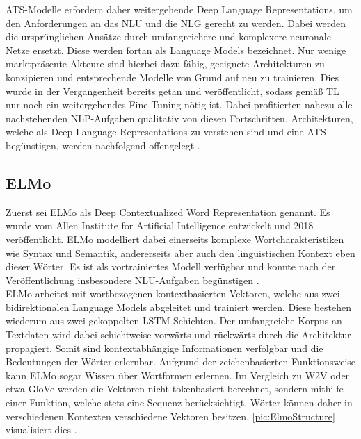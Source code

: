 \noindent
\ac{ATS}-Modelle erfordern daher weitergehende Deep Language Representations, um den Anforderungen an das \ac{NLU} und die \ac{NLG} gerecht zu werden. Dabei werden die ursprünglichen Ansätze durch umfangreichere und komplexere neuronale Netze ersetzt. Diese werden fortan als Language Models bezeichnet. Nur wenige marktpräsente Akteure sind hierbei dazu fähig, geeignete Architekturen zu konzipieren und entsprechende Modelle von Grund auf neu zu trainieren. Dies wurde in der Vergangenheit bereits getan und veröffentlicht, sodass gemäß \ac{TL} nur noch ein weitergehendes Fine-Tuning nötig ist. Dabei profitierten nahezu alle nachstehenden \ac{NLP}-Aufgaben qualitativ von diesen Fortschritten. Architekturen, welche als Deep Language Representations zu verstehen sind und eine \ac{ATS} begünstigen, werden nachfolgend offengelegt \cite[S.~25]{NIT19}.


\subsection{ELMo}
\noindent
Zuerst sei \ac{ELMo} als Deep Contextualized Word Representation genannt. Es wurde vom Allen Institute for Artificial Intelligence entwickelt und 2018 veröffentlicht. \ac{ELMo} modelliert dabei einerseits komplexe Wortcharakteristiken wie Syntax und Semantik, andererseits aber auch den linguistischen Kontext eben dieser Wörter. Es ist als vortrainiertes Modell verfügbar und konnte nach der Veröffentlichung insbesondere \ac{NLU}-Aufgaben begünstigen \cite[S.~1]{PET18}.\\

\noindent
\ac{ELMo} arbeitet mit wortbezogenen kontextbasierten Vektoren, welche aus zwei bidirektionalen Language Models abgeleitet und trainiert werden. Diese bestehen wiederum aus zwei gekoppelten \ac{LSTM}-Schichten. Der umfangreiche Korpus an Textdaten wird dabei schichtweise vorwärts und rückwärts durch die Architektur propagiert. Somit sind kontextabhängige Informationen verfolgbar und die Bedeutungen der Wörter erlernbar. Aufgrund der zeichenbasierten Funktionsweise kann \ac{ELMo} sogar Wissen über Wortformen erlernen. Im Vergleich zu \ac{W2V} oder etwa \ac{GloVe} werden die Vektoren nicht tokenbasiert berechnet, sondern mithilfe einer Funktion, welche stets eine Sequenz berücksichtigt. Wörter können daher in verschiedenen Kontexten verschiedene Vektoren besitzen. \autoref{pic:ElmoStructure} visualisiert dies \cite[S.~2-3]{PET18}.

